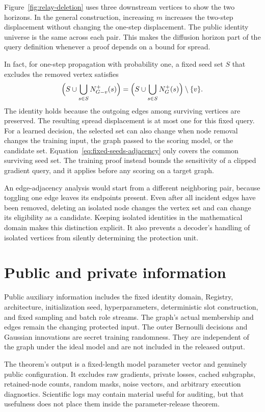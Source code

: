 Figure~\ref{fig:relay-deletion} uses three downstream vertices to show the two horizons. In the general construction, increasing $m$ increases the two-step displacement without changing the one-step displacement. The public identity universe is the same across each pair. This makes the diffusion horizon part of the query definition whenever a proof depends on a bound for spread.

In fact, for one-step propagation with probability one, a fixed seed set $S$ that excludes the removed vertex satisfies
\begin{equation}
 \Bigl(S\cup\bigcup_{s\in S}N^+_{G-v}(s)\Bigr)
 =
 \Bigl(S\cup\bigcup_{s\in S}N^+_G(s)\Bigr)\setminus\{v\}.
 \label{eq:fixed-seeds-adjacency}
\end{equation}
The identity holds because the outgoing edges among surviving vertices are preserved. The resulting spread displacement is at most one for this fixed query. For a learned decision, the selected set can also change when node removal changes the training input, the graph passed to the scoring model, or the candidate set. Equation~\eqref{eq:fixed-seeds-adjacency} only covers the common surviving seed set. The training proof instead bounds the sensitivity of a clipped gradient query, and it applies before any scoring on a target graph.

An edge-adjacency analysis would start from a different neighboring pair, because toggling one edge leaves its endpoints present. Even after all incident edges have been removed, deleting an isolated node changes the vertex set and can change its eligibility as a candidate. Keeping isolated identities in the mathematical domain makes this distinction explicit. It also prevents a decoder's handling of isolated vertices from silently determining the protection unit.

\section{Public and private information}
Public auxiliary information includes the fixed identity domain, Registry, architecture, initialization seed, hyperparameters, deterministic slot construction, and fixed sampling and batch role streams. The graph's actual membership and edges remain the changing protected input. The outer Bernoulli decisions and Gaussian innovations are secret training randomness. They are independent of the graph under the ideal model and are not included in the released output.

The theorem's output is a fixed-length model parameter vector and genuinely public configuration. It excludes raw gradients, private losses, cached subgraphs, retained-node counts, random masks, noise vectors, and arbitrary execution diagnostics. Scientific logs may contain material useful for auditing, but that usefulness does not place them inside the parameter-release theorem.

